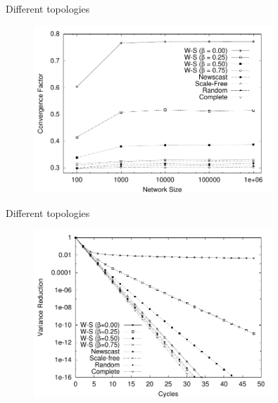 \begin{frame}{Different topologies}

\begin{figure}
	\includegraphics[width=0.80\textwidth]{rate}
\end{figure}

\end{frame}

\begin{frame}{Different topologies}

\begin{figure}
	\includegraphics[width=0.80\textwidth]{reduction}
\end{figure}

\end{frame}


